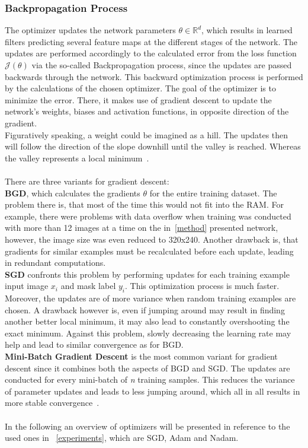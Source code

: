 \subsubsection{Backpropagation Process}
The optimizer updates the network parameters $\theta \in \mathbb{R}^d$, which results in learned filters predicting
several feature maps at
the different stages of the network.
The updates are performed accordingly to the calculated error from the loss function $\mathcal{J}(\theta)$ via the
so-called Backpropagation process, since the updates are passed backwards through the network.
This backward optimization process is performed by the calculations of the chosen optimizer.
The goal of the optimizer is to minimize the error.
There, it makes use of gradient descent to update the network's weights, biases and activation functions, in opposite
direction
of the gradient.\\
Figuratively speaking, a weight could be imagined as a hill.
The updates then will follow the direction of the slope downhill until the valley is reached.
Whereas the valley represents a local minimum~\cite{optimizersoverview}.
\\\mbox{}\\
There are three variants for gradient descent:\\
\textbf{\gls{BGD}}, which calculates the gradients $\theta$ for the entire training dataset.
The problem there is, that most of the time this would not fit into the RAM.
For example, there were problems with data overflow when training was conducted with more than 12 images
at a time on the in~\autoref{method} presented network, however, the image size was even reduced
to 320x240.
Another drawback is, that gradients for similar examples must be recalculated before each update, leading in redundant computations.\\
\textbf{\gls{SGD}} confronts this problem by performing updates for each training example input image $x_i$
and mask label $y_i$.
This optimization process is much faster.
Moreover, the updates are of more variance when random training examples are chosen.
A drawback however is, even if jumping around may result in finding another better local minimum, it may also
lead to constantly overshooting the exact minimum.
Against this problem, slowly decreasing the learning rate may help and lead to similar convergence as for BGD.\\
\textbf{Mini-Batch Gradient Descent} is the most common variant for gradient descent since it combines both the
aspects of
\gls{BGD} and \gls{SGD}.
The updates are conducted for every mini-batch of \textit{n} training samples.
This reduces the variance of parameter updates and leads to less jumping around, which all in all results in more stable
convergence~\cite{optimizersoverview}.
\\\mbox{}\\
In the following an overview of optimizers will be presented in reference to the used ones in ~\autoref{experiments},
which are
\gls{SGD}, \gls{Adam} and \gls{Nadam}.


